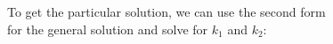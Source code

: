 \documentclass[preview]{standalone}
\begin{document}
\begin{center}
\raggedright
                To get the particular solution, we can use the second form \\
                for the general solution and solve for $k_1$ and $k_2$:
\end{center}
\end{document}
